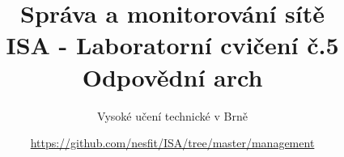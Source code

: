 \documentclass[a4paper,11pt]{article}
\title{Správa a monitorování sítě\\
{\bf\large ISA - Laboratorní cvičení č.5}\\
{\bf\large Odpovědní arch}}
\author{Vysoké učení technické v Brně}
\date{\url{https://github.com/nesfit/ISA/tree/master/management}}
\begin{document}
{\let\newpage\relax\maketitle}



\end{document}
